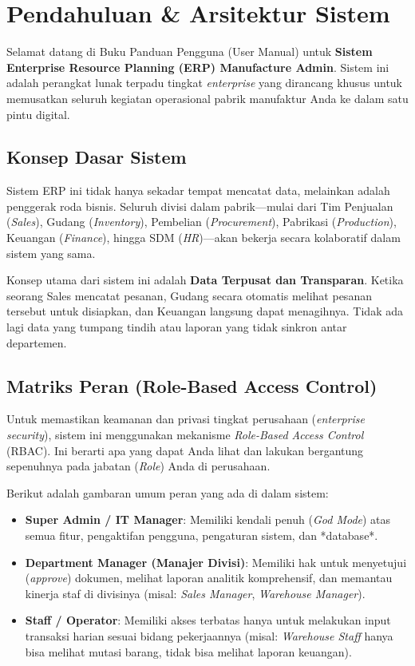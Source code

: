 \chapter{Pendahuluan \& Arsitektur Sistem}

Selamat datang di Buku Panduan Pengguna (User Manual) untuk \textbf{Sistem Enterprise Resource Planning (ERP) Manufacture Admin}. Sistem ini adalah perangkat lunak terpadu tingkat \textit{enterprise} yang dirancang khusus untuk memusatkan seluruh kegiatan operasional pabrik manufaktur Anda ke dalam satu pintu digital.

\section{Konsep Dasar Sistem}
Sistem ERP ini tidak hanya sekadar tempat mencatat data, melainkan adalah penggerak roda bisnis. Seluruh divisi dalam pabrik—mulai dari Tim Penjualan (\textit{Sales}), Gudang (\textit{Inventory}), Pembelian (\textit{Procurement}), Pabrikasi (\textit{Production}), Keuangan (\textit{Finance}), hingga SDM (\textit{HR})—akan bekerja secara kolaboratif dalam sistem yang sama.

Konsep utama dari sistem ini adalah \textbf{Data Terpusat dan Transparan}. Ketika seorang Sales mencatat pesanan, Gudang secara otomatis melihat pesanan tersebut untuk disiapkan, dan Keuangan langsung dapat menagihnya. Tidak ada lagi data yang tumpang tindih atau laporan yang tidak sinkron antar departemen.

\section{Matriks Peran (Role-Based Access Control)}
Untuk memastikan keamanan dan privasi tingkat perusahaan (\textit{enterprise security}), sistem ini menggunakan mekanisme \textit{Role-Based Access Control} (RBAC). Ini berarti apa yang dapat Anda lihat dan lakukan bergantung sepenuhnya pada jabatan (\textit{Role}) Anda di perusahaan.

Berikut adalah gambaran umum peran yang ada di dalam sistem:
\begin{itemize}
    \item \textbf{Super Admin / IT Manager}: Memiliki kendali penuh (\textit{God Mode}) atas semua fitur, pengaktifan pengguna, pengaturan sistem, dan *database*.
    \item \textbf{Department Manager (Manajer Divisi)}: Memiliki hak untuk menyetujui (\textit{approve}) dokumen, melihat laporan analitik komprehensif, dan memantau kinerja staf di divisinya (misal: \textit{Sales Manager}, \textit{Warehouse Manager}).
    \item \textbf{Staff / Operator}: Memiliki akses terbatas hanya untuk melakukan input transaksi harian sesuai bidang pekerjaannya (misal: \textit{Warehouse Staff} hanya bisa melihat mutasi barang, tidak bisa melihat laporan keuangan).
\end{itemize}

